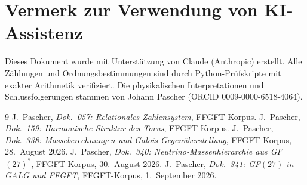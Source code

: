 \section*{Vermerk zur Verwendung von KI-Assistenz}

Dieses Dokument wurde mit Unterstützung von Claude (Anthropic) erstellt.
Alle Zählungen und Ordnungsbestimmungen sind durch Python-Prüfskripte mit
exakter Arithmetik verifiziert. Die physikalischen Interpretationen und
Schlussfolgerungen stammen von Johann Pascher (ORCID 0009-0000-6518-4064).

\begin{thebibliography}{9}
 J.~Pascher, \textit{Dok.~057: Relationales Zahlensystem}, FFGFT-Korpus.
 J.~Pascher, \textit{Dok.~159: Harmonische Struktur des Torus}, FFGFT-Korpus.
 J.~Pascher, \textit{Dok.~338: Masseberechnungen und Galois-Gegenüberstellung}, FFGFT-Korpus, 28.~August 2026.
 J.~Pascher, \textit{Dok.~340: Neutrino-Massenhierarchie aus GF$(27)^*$}, FFGFT-Korpus, 30.~August 2026.
 J.~Pascher, \textit{Dok.~341: GF$(27)$ in GALG und FFGFT}, FFGFT-Korpus, 1.~September 2026.
\end{thebibliography}
